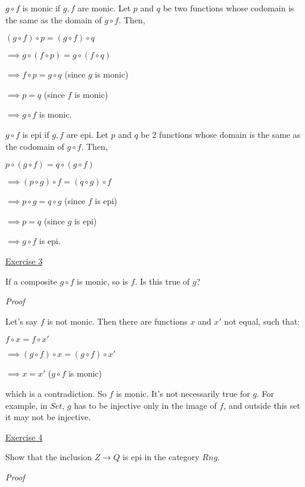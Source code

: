 \documentclass[11pt]{article}
\begin{document}
$g \circ f$ is monic if $g, f$ are monic. Let $p$ and $q$ be two functions whose codomain is the same as the domain of $g \circ f$. Then, 

$(g \circ f) \circ p = (g \circ f) \circ q$

$\implies g \circ (f \circ p) = g \circ (f \circ q)$

$\implies f \circ p = g \circ q$ (since $g$ is monic)

$\implies p = q$ (since $f$ is monic)

$\implies g \circ f$ is monic.


$g \circ f$ is epi if $g, f$ are epi. Let $p$ and $q$ be 2 functions whose domain is the same as the codomain of $g \circ f$. Then,

$p \circ (g \circ f) = q \circ (g \circ f)$

$\implies (p \circ g) \circ f = (q \circ g) \circ f$

$\implies p \circ g = q \circ g$ (since $f$ is epi)

$\implies p = q$ (since $g$ is epi)

$\implies g \circ f$ is epi.

\vspace{2mm}
\noindent
\underline{Exercise 3}
\vspace{2mm}

If a composite $g \circ f$ is monic, so is $f$. Is this true of $g$?

\vspace{2mm}
\noindent
\emph{Proof}

Let's say $f$ is not monic. Then there are functions $x$ and $x'$ not equal, such that:

$f \circ x = f \circ x'$

$\implies (g \circ f) \circ x = (g \circ f) \circ x'$

$\implies x = x'$ ($g \circ f$ is monic)

which is a contradiction. So $f$ is monic. It's not necessarily true for $g$. For example, in $Set$, $g$ has to be injective only in the image of $f$, and outside this set it may not be injective.


\vspace{2mm}
\noindent
\underline{Exercise 4}
\vspace{2mm}

Show that the inclusion $Z \to Q$ is epi in the category $Rng$.

\vspace{2mm}
\noindent
\emph{Proof}
\end{document}
